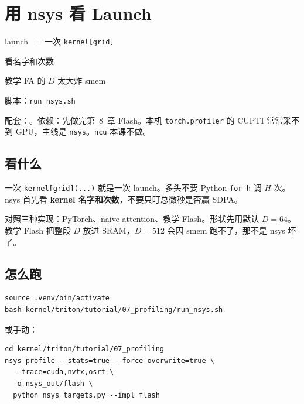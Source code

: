 \chapter{用 nsys 看 Launch}

\begin{introduction}
  \item launch $=$ 一次 \texttt{kernel[grid]}
  \item 看名字和次数
  \item 教学 FA 的 $D$ 太大炸 smem
  \item 脚本：\texttt{run\_nsys.sh}
\end{introduction}

配套：。依赖：先做完第~8~章 Flash。本机 \texttt{torch.profiler} 的 CUPTI 常常采不到 GPU，主线是 \texttt{nsys}。\texttt{ncu} 本课不做。

\section{看什么}

一次 \texttt{kernel[grid](...)} 就是一次 launch。多头不要 Python \texttt{for h} 调 $H$ 次。nsys 首先看 \textbf{kernel 名字和次数}，不要只盯总微秒是否赢 SDPA。

\figlaunch

对照三种实现：PyTorch、naive attention、教学 Flash。形状先用默认 $D=64$。教学 Flash 把整段 $D$ 放进 SRAM，$D=512$ 会因 smem 跑不了，那不是 nsys 坏了。

\section{怎么跑}

\begin{runcmd}
\begin{lstlisting}[style=shell]
source .venv/bin/activate
bash kernel/triton/tutorial/07_profiling/run_nsys.sh
\end{lstlisting}
\end{runcmd}

或手动：

\begin{runcmd}[手动 nsys]
\begin{lstlisting}[style=shell]
cd kernel/triton/tutorial/07_profiling
nsys profile --stats=true --force-overwrite=true \
  --trace=cuda,nvtx,osrt \
  -o nsys_out/flash \
  python nsys_targets.py --impl flash
\end{lstlisting}
\end{runcmd}

